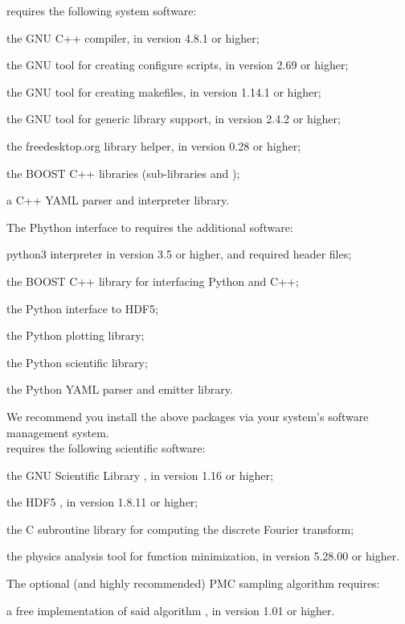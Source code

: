 \EOS requires the following system software:
\begin{description}[labelwidth=.15\textwidth]
    \item[\package{g++}] the GNU C++ compiler, in version 4.8.1 or higher;
    \item[\package{autoconf}] the GNU tool for creating configure scripts, in version 2.69 or higher;
    \item[\package{automake}] the GNU tool for creating makefiles, in version 1.14.1 or higher;
    \item[\package{libtool}] the GNU tool for generic library support, in version 2.4.2 or higher;
    \item[\package{pkg-config}] the freedesktop.org library helper, in version 0.28 or higher;
    \item[\package{BOOST}] the BOOST C++ libraries (sub-libraries  and
            );
    \item[\package{yaml-cpp}] a C++ YAML parser and interpreter library.
\end{description}
The Phython \cite{Python} interface to \EOS requires the additional software:
\begin{description}[labelwidth=.15\textwidth]
    \item[\package{python3}] python3 interpreter in version 3.5 or higher, and required header files;
    \item[\package{BOOST}] the BOOST C++ library  for interfacing Python and C++;
    \item[\package{h5py}] the Python interface to HDF5;
    \item[\package{matplotlib}] the Python plotting library;
    \item[\package{scipy}] the Python scientific library;
    \item[\package{PyYAML}] the Python YAML parser and emitter library.
\end{description}
We recommend you install the above packages via your system's software management system.\\


\EOS requires the following scientific software:
\begin{description}[labelwidth=.15\textwidth]
    \item[\package{GSL}] the GNU Scientific Library \cite{GSL}, in version 1.16 or higher;
    \item[\package{HDF5}] the \gls{HDF5} \cite{HDF5}, in version 1.8.11 or higher;
    \item[\package{FFTW3}] the C subroutine library for computing the discrete Fourier transform;
    \item[\package{Minuit2}] the physics analysis tool for function minimization, in version 5.28.00 or higher.
\end{description}
The optional (and highly recommended) \gls{PMC} sampling algorithm requires:
\begin{description}[labelwidth=.15\textwidth]
    \item[\package{pmclib}] a free implementation of said algorithm \cite{libpmc}, in version 1.01 or higher.
\end{description}

